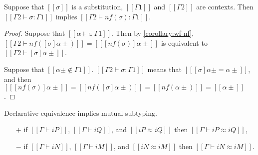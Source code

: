 \begin{lemma}
  \label{lemma:norm-subst-sig}
  Suppose that $[[σ]]$ is a substitution, $[[Γ1]]$ and $[[Γ2]]$ are contexts.
  Then $[[Γ2 ⊢ σ : Γ1]]$ implies $[[Γ2 ⊢ nf(σ) : Γ1]]$.
\end{lemma}
\begin{proof}
  Suppose that $[[α± ∊ Γ1]]$. 
  Then by \cref{corollary:wf-nf}, $[[Γ2 ⊢ nf([σ]α±)]] = [[ [nf(σ)]α± ]]$ 
  is equivalent to $[[Γ2 ⊢ [σ]α±]]$.

  Suppose that $[[α± ∉ Γ1]]$. 
  $[[Γ2 ⊢ σ : Γ1]]$ means that $[[ [σ]α± = α± ]]$, 
  and then $[[ [nf(σ)]α± ]] = [[nf([σ]α±)]] = [[nf(α±)]] = [[α±]]$.
\end{proof}


\begin{lemma}
  \label{lemma:equiv-soundness}
  Declarative equivalence implies mutual subtyping.
  \begin{itemize}
    \item[$+$] if $[[Γ ⊢ iP]]$, $[[Γ ⊢ iQ]]$, and $[[iP ≈ iQ]]$ then $[[Γ ⊢ iP ≈ iQ]]$,
    \item[$-$] if $[[Γ ⊢ iN]]$, $[[Γ ⊢ iM]]$, and $[[iN ≈ iM]]$ then $[[Γ ⊢ iN ≈ iM]]$.
  \end{itemize}
\end{lemma}
